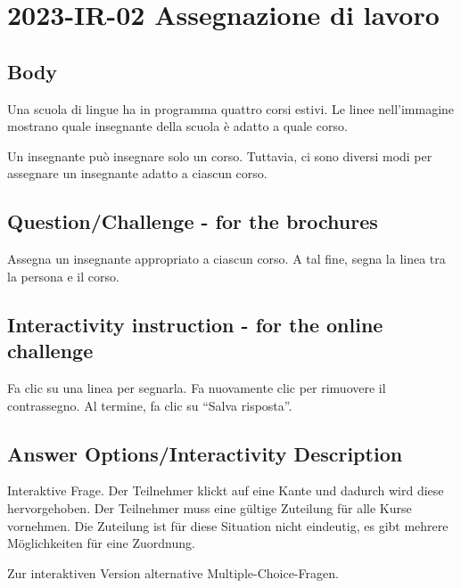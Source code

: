 \documentclass[a4paper,11pt]{report}
\newcommand{\taskGraphicsFolder}{..}
\begin{document}
\section*{\centering{} 2023-IR-02 Assegnazione di lavoro}


\subsection*{Body}

Una scuola di lingue ha in programma quattro corsi estivi.
Le linee nell’immagine mostrano quale insegnante della scuola è adatto a quale corso.

{\centering%
\par}

Un insegnante può insegnare solo un corso.
Tuttavia, ci sono diversi modi per assegnare un insegnante adatto a ciascun corso.

{\em


\subsection*{Question/Challenge - for the brochures}

Assegna un insegnante appropriato a ciascun corso.
A tal fine, segna la linea tra la persona e il corso.

}


\subsection*{Interactivity instruction - for the online challenge}

Fa clic su una linea per segnarla. Fa nuovamente clic per rimuovere il contrassegno. Al termine, fa clic su \enquote{Salva risposta}.

\begingroup
\renewcommand{\arraystretch}{1.5}
\subsection*{Answer Options/Interactivity Description}

Interaktive Frage. Der Teilnehmer klickt auf eine Kante und dadurch wird diese hervorgehoben. Der Teilnehmer muss eine gültige Zuteilung für alle Kurse vornehmen. Die Zuteilung ist für diese Situation nicht eindeutig, es gibt mehrere Möglichkeiten für eine Zuordnung.

Zur interaktiven Version alternative Multiple-Choice-Fragen.
\end{document}
